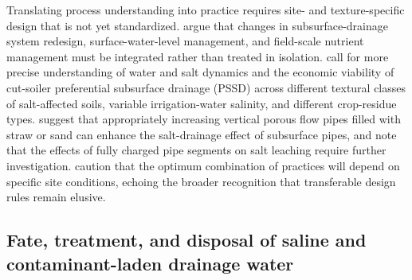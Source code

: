 Translating process understanding into practice requires site- and texture-specific design that is not yet standardized. \textcite{vandenEertwegh2006} argue that changes in subsurface-drainage system redesign, surface-water-level management, and field-scale nutrient management must be integrated rather than treated in isolation. \textcite{Neha2022} call for more precise understanding of water and salt dynamics and the economic viability of cut-soiler preferential subsurface drainage (PSSD) across different textural classes of salt-affected soils, variable irrigation-water salinity, and different crop-residue types. \textcite{Wang2024d} suggest that appropriately increasing vertical porous flow pipes filled with straw or sand can enhance the salt-drainage effect of subsurface pipes, and \textcite{Yao2024} note that the effects of fully charged pipe segments on salt leaching require further investigation. \textcite{Jayawardane2001} caution that the optimum combination of practices will depend on specific site conditions, echoing the broader recognition that transferable design rules remain elusive.

\subsection{Fate, treatment, and disposal of saline and contaminant-laden drainage water}


